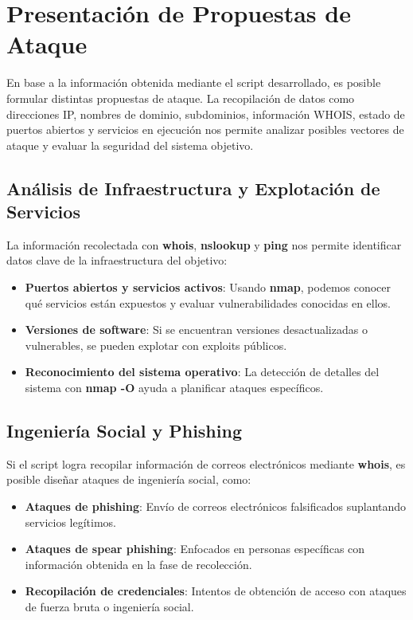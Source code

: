 \section{Presentación de Propuestas de Ataque}

En base a la información obtenida mediante el script desarrollado, es posible formular distintas propuestas de ataque. La recopilación de datos como direcciones IP, nombres de dominio, subdominios, información WHOIS, estado de puertos abiertos y servicios en ejecución nos permite analizar posibles vectores de ataque y evaluar la seguridad del sistema objetivo.

\subsection{Análisis de Infraestructura y Explotación de Servicios}
La información recolectada con \textbf{whois}, \textbf{nslookup} y \textbf{ping} nos permite identificar datos clave de la infraestructura del objetivo:
\begin{itemize}
    \item \textbf{Puertos abiertos y servicios activos}: Usando \textbf{nmap}, podemos conocer qué servicios están expuestos y evaluar vulnerabilidades conocidas en ellos.
    \item \textbf{Versiones de software}: Si se encuentran versiones desactualizadas o vulnerables, se pueden explotar con exploits públicos.
    \item \textbf{Reconocimiento del sistema operativo}: La detección de detalles del sistema con \textbf{nmap -O} ayuda a planificar ataques específicos.
\end{itemize}

\subsection{Ingeniería Social y Phishing}
Si el script logra recopilar información de correos electrónicos mediante \textbf{whois}, es posible diseñar ataques de ingeniería social, como:
\begin{itemize}
    \item \textbf{Ataques de phishing}: Envío de correos electrónicos falsificados suplantando servicios legítimos.
    \item \textbf{Ataques de spear phishing}: Enfocados en personas específicas con información obtenida en la fase de recolección.
    \item \textbf{Recopilación de credenciales}: Intentos de obtención de acceso con ataques de fuerza bruta o ingeniería social.
\end{itemize}

